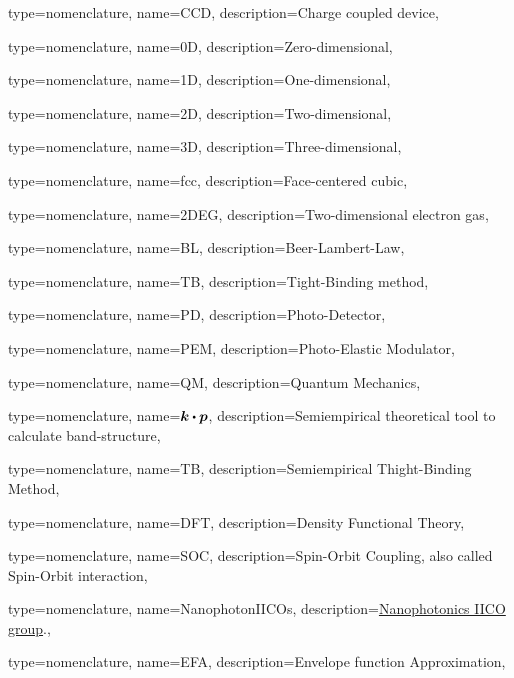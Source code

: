 {type={nomenclature},
name={CCD},
description={Charge coupled device},
}

{type={nomenclature},
name={0D},
description={Zero-dimensional},
}

{type={nomenclature},
name={1D},
description={One-dimensional},
}

{type={nomenclature},
name={2D},
description={Two-dimensional},
}

{type={nomenclature},
name={3D},
description={Three-dimensional},
}

{type={nomenclature},
name={fcc},
description={Face-centered cubic},
}


{type={nomenclature},
name={2DEG},
description={Two-dimensional electron gas},
}

{type={nomenclature},
name={BL},
description={Beer-Lambert-Law},
}

{type={nomenclature},
name={TB},
description={Tight-Binding method},
}

{type={nomenclature},
name={PD},
description={Photo-Detector},
}

{type={nomenclature},
name={PEM},
description={Photo-Elastic Modulator},
}

{type={nomenclature},
name={QM},
description={Quantum Mechanics},
}

{type={nomenclature},
name={$\boldsymbol{k}\bigcdot \boldsymbol{p}$},
description={Semiempirical theoretical tool to calculate band-structure},
}


{type={nomenclature},
name={TB},
description={Semiempirical Thight-Binding Method},
}

{type={nomenclature},
name={DFT},
description={Density Functional Theory},
}

{type={nomenclature},
name={SOC},
description={Spin-Orbit Coupling, also called Spin-Orbit interaction},
}

{type={nomenclature},
name={NanophotonIICOs},
description={\href{https://github.com/NanophotonIICOs}{Nanophotonics IICO group}.},
}

{type={nomenclature},
name={EFA},
description={Envelope function Approximation},
}

